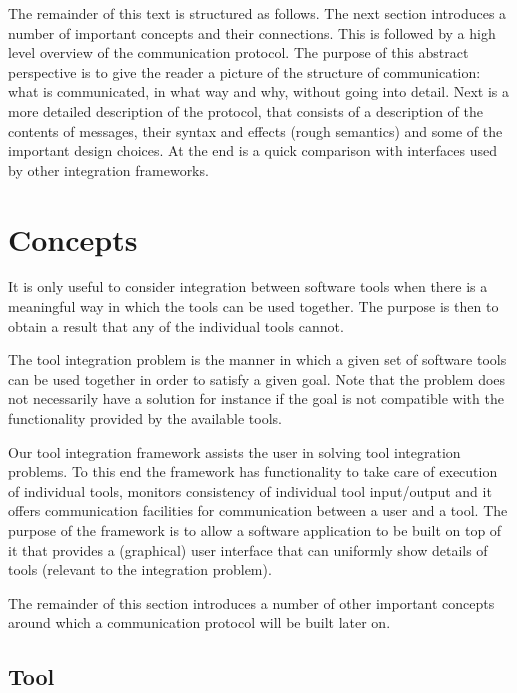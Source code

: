 \documentclass{article}
\begin{document}
  The remainder of this text is structured as follows. The next section
  introduces a number of important concepts and their connections. This is
  followed by a high level overview of the communication protocol.  The purpose
  of this abstract perspective is to give the reader a picture of the structure
  of communication: what is communicated, in what way and why, without going
  into detail. Next is a more detailed description of the protocol, that
  consists of a description of the contents of messages, their syntax and
  effects (rough semantics) and some of the important design choices.  At the
  end is a quick comparison with interfaces used by other integration
  frameworks.

 \section{Concepts}

   It is only useful to consider integration between software tools when there
   is a meaningful way in which the tools can be used together. The purpose is
   then to obtain a result that any of the individual tools cannot.
   
   The tool integration problem is the manner in which a given set of software
   tools can be used together in order to satisfy a given goal. Note that the
   problem does not necessarily have a solution for instance if the goal is not
   compatible with the functionality provided by the available tools.
   
   Our tool integration framework assists the user in solving tool integration
   problems. To this end the framework has functionality to take care of
   execution of individual tools, monitors consistency of individual tool
   input/output and it offers communication facilities for communication
   between a user and a tool. The purpose of the framework is to allow a
   software application to be built on top of it that provides a (graphical) user
   interface that can uniformly show details of tools (relevant to the
   integration problem).
 
   The remainder of this section introduces a number of other important
   concepts around which a communication protocol will be built later on.

  \subsection{Tool}
\end{document}
